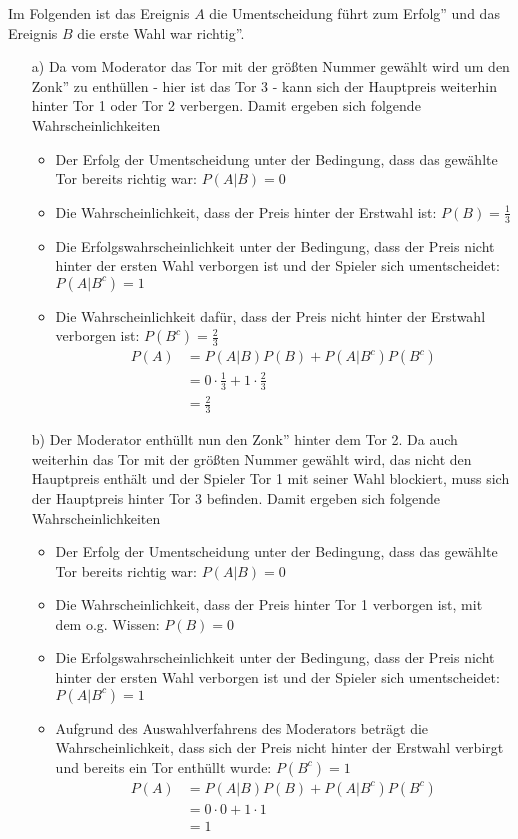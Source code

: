 Im Folgenden ist das Ereignis $A$ \glqq die Umentscheidung führt zum Erfolg'' und das Ereignis $B$ \glqq die erste Wahl war richtig''.
\begin{enumerate}
	\item[a)] Da vom Moderator das Tor mit der größten Nummer gewählt wird um den \glqq Zonk'' zu enthüllen - hier ist das Tor 3 - kann sich der Hauptpreis weiterhin hinter Tor 1 oder Tor 2 verbergen. Damit ergeben sich folgende Wahrscheinlichkeiten
		\begin{itemize}
			\item Der Erfolg der Umentscheidung unter der Bedingung, dass das gewählte Tor bereits richtig war: $P(A|B) = 0$
			\item Die Wahrscheinlichkeit, dass der Preis hinter der Erstwahl ist: $P(B)=\frac{1}{3}$
			\item Die Erfolgswahrscheinlichkeit unter der Bedingung, dass der Preis nicht hinter der ersten Wahl verborgen ist und der Spieler sich umentscheidet: $P(A|B^c)=1$
			\item Die Wahrscheinlichkeit dafür, dass der Preis nicht hinter der Erstwahl verborgen ist: $P(B^c)=\frac{2}{3}$
			\begin{equation*}
				\begin{split}
					P(A) 	&= P(A|B)P(B) + P(A|B^c)P(B^c)\\
							&= 0 \cdot \frac{1}{3} + 1 \cdot \frac{2}{3}\\
							&= \frac{2}{3}
				\end{split}
			\end{equation*} 
		\end{itemize}
	\item[b)] Der Moderator enthüllt nun den \glqq Zonk'' hinter dem Tor 2. Da auch weiterhin das Tor mit der größten Nummer gewählt wird, das nicht den Hauptpreis enthält und der Spieler Tor 1 mit seiner Wahl blockiert, muss sich der Hauptpreis hinter Tor 3 befinden. Damit ergeben sich folgende Wahrscheinlichkeiten
		\begin{itemize}
			\item Der Erfolg der Umentscheidung unter der Bedingung, dass das gewählte Tor bereits richtig war: $P(A|B) = 0$
			\item Die Wahrscheinlichkeit, dass der Preis hinter Tor 1 verborgen ist, mit dem o.g. Wissen: $P(B) = 0$
			\item Die Erfolgswahrscheinlichkeit unter der Bedingung, dass der Preis nicht hinter der ersten Wahl verborgen ist und der Spieler sich umentscheidet: $P(A|B^c)=1$
			\item Aufgrund des Auswahlverfahrens des Moderators beträgt die Wahrscheinlichkeit, dass sich der Preis nicht hinter der Erstwahl verbirgt und bereits ein Tor enthüllt wurde: $P(B^c) = 1$
			\begin{equation*}
				\begin{split}
					P(A) 	&= P(A|B)P(B) + P(A|B^c)P(B^c)\\
							&= 0 \cdot 0 + 1 \cdot 1\\
							&= 1
				\end{split}
			\end{equation*}

		\end{itemize}
\end{enumerate}
